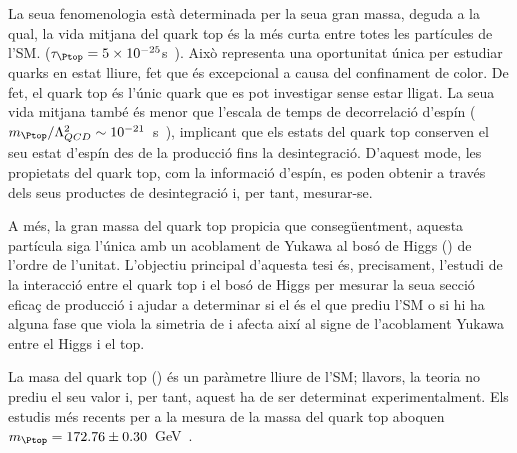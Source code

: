La seua fenomenologia està determinada per 
la seua gran massa, deguda a la qual, la vida mitjana del quark top és la més curta entre totes les partícules de l'SM. 
($\tau_{\Ptop} = 5 \times 10^{-25}$s~\cite{Taylor:1998uk}). Això representa una 
oportunitat única per estudiar quarks en estat lliure, fet que és 
excepcional a causa del confinament de color. De fet, el quark top és l'únic 
quark que es pot investigar sense estar lligat. La seua vida mitjana també és 
menor que l'escala de temps de decorrelació d'espín 
($\mtop /\Lambda^{2}_{QCD} \sim 10^{-21}$~s~\cite{Mahlon:2010gw}), 
implicant que els estats del quark top conserven el seu estat d'espín des de 
la producció fins la desintegració.
D'aquest mode, les propietats del quark top, com la informació d'espín, es poden 
obtenir a través dels seus productes de desintegració i, per tant, mesurar-se.


A més, la gran massa del quark top propicia que consegüentment, aquesta partícula siga
l'única amb un acoblament  de Yukawa al bosó de Higgs (\yt) de l'ordre de l'unitat.  L'objectiu 
principal d'aquesta tesi és, precisament, l'estudi de la interacció entre el quark top 
i el bosó de Higgs per mesurar la seua secció eficaç de producció i ajudar a determinar 
si el \yt és el que prediu l'SM o si hi ha alguna fase que viola la simetria de \CP i 
afecta així al signe de l'acoblament Yukawa entre el Higgs i el top.

La masa del quark top (\mtop) és un paràmetre lliure de l'SM; llavors, la teoria no prediu 
el seu valor i, per tant, aquest ha de ser determinat experimentalment. Els estudis més recents 
per a la mesura de la massa del quark top aboquen $\mtop = 172.76 \pm 0.30$~GeV~\cite{Workman:2022ynf}. %


